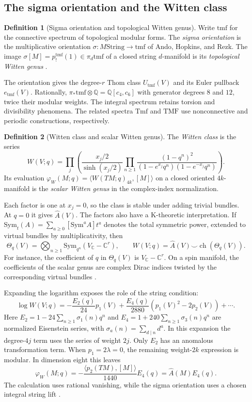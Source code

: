 \documentclass[11pt]{article}
\theoremstyle{definition}
\newtheorem{defn}{Definition}[section]
\newcommand{\tmf}{\mathrm{tmf}}
\newcommand{\ch}{\operatorname{ch}}
\newcommand{\Q}{\mathbb Q}
\newcommand{\Ahat}{\widehat A}
\newcommand{\String}{\mathrm{String}}
\begin{document}
\subsection{The sigma orientation and the Witten class}\label{sec:sigma-orientation}
\begin{defn}[Sigma orientation and topological Witten genus]
Write \(\tmf\) for the connective spectrum of topological modular forms. The \emph{sigma orientation} is the multiplicative orientation \(\sigma:M\String\to\tmf\) of Ando, Hopkins, and Rezk. The image \(\sigma[M]=p_!^{\tmf}(1)\in\pi_d\tmf\) of a closed string \(d\)-manifold is its \emph{topological Witten genus} \cite{AHR,Hopkins}.
\end{defn}
The orientation gives the degree-\(r\) Thom class \(U_{\tmf}(V)\) and its Euler pullback \(e_{\tmf}(V)\). Rationally, \(\pi_*\tmf\otimes\Q=\Q[c_4,c_6]\) with generator degrees \(8\) and \(12\), twice their modular weights. The integral spectrum retains torsion and divisibility phenomena. The related spectra \(\mathrm{Tmf}\) and \(\mathrm{TMF}\) use nonconnective and periodic constructions, respectively.

\begin{defn}[Witten class and scalar Witten genus]
The \emph{Witten class} is the series
\[
 W(V;q)=\prod_j\left(\frac{x_j/2}{\sinh(x_j/2)}
 \prod_{n\ge1}\frac{(1-q^n)^2}{(1-e^{x_j}q^n)(1-e^{-x_j}q^n)}\right).
\]
Its evaluation \(\varphi_W(M;q)=\langle W(TM;q)_{4k},[M]\rangle\) on a closed oriented \(4k\)-manifold is the \emph{scalar Witten genus} in the complex-index normalization.
\end{defn}
Each factor is one at \(x_j=0\), so the class is stable under adding trivial bundles. At \(q=0\) it gives \(\Ahat(V)\). The factors also have a K-theoretic interpretation. If \(\mathrm{Sym}_t(A)=\sum_{a\ge0}[\mathrm{Sym}^a A]t^a\) denotes the total symmetric power, extended to virtual bundles by multiplicativity, then
\[
 \Theta_q(V)=\bigotimes_{n\ge1}\mathrm{Sym}_{q^n}(V_{\mathbb C}-\mathbb C^r),
 \qquad W(V;q)=\Ahat(V)\smile\ch(\Theta_q(V)).
\]
For instance, the coefficient of \(q\) in \(\Theta_q(V)\) is \(V_{\mathbb C}-\mathbb C^r\). On a spin manifold, the coefficients of the scalar genus are complex Dirac indices twisted by the corresponding virtual bundles \cite{BN,Wl}.

Expanding the logarithm exposes the role of the string condition:
\[
 \log W(V;q)=-\frac{E_2(q)}{24}p_1(V)
  +\frac{E_4(q)}{2880}(p_1(V)^2-2p_2(V))+\cdots .
\]
Here \(E_2=1-24\sum_{n\ge1}\sigma_1(n)q^n\) and \(E_4=1+240\sum_{n\ge1}\sigma_3(n)q^n\) are normalized Eisenstein series, with \(\sigma_a(n)=\sum_{d\mid n}d^a\). In this expansion the degree-\(4j\) term uses the series of weight \(2j\). Only \(E_2\) has an anomalous transformation term. When \(p_1=2\lambda=0\), the remaining weight-\(2k\) expression is modular. In dimension eight this leaves
\[
 \varphi_W(M;q)=-\frac{\langle p_2(TM),[M]\rangle}{1440}E_4(q)
 =\Ahat(M)E_4(q).
\]
The calculation uses rational vanishing, while the sigma orientation uses a chosen integral string lift \cite{BN,We}.
\end{document}
